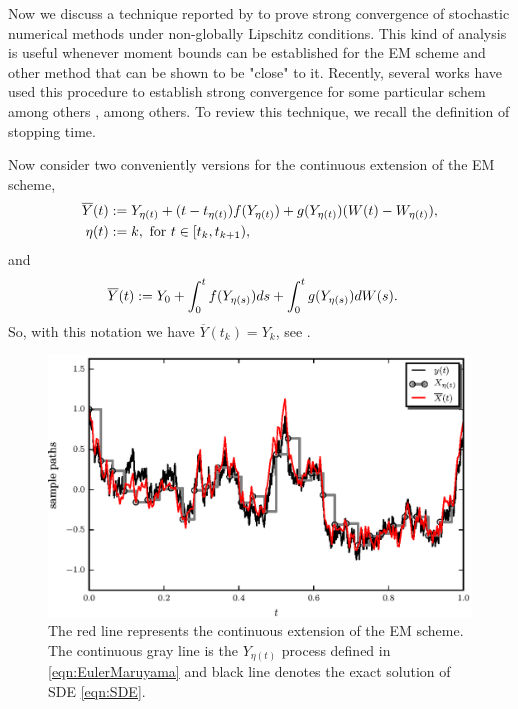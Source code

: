 	Now we discuss a technique  reported  by  \citet*{Higham2002b} to prove strong convergence 
of stochastic numerical methods under non-globally Lipschitz conditions.
This kind of analysis is useful whenever moment bounds can be established for the EM scheme and 
other method that can be shown to be "close" to it. Recently, several works have used this procedure to establish 
strong convergence for some particular schem among others
\cite{Beyn2010, Guo2014, Hutzenthaler2015, Hutzenthaler2012a,Hutzenthaler2010,Lamba2007,Mao2013,Tretyakov2013}, among
others. To review this technique, we recall the definition of stopping time. 

Now consider two conveniently versions for the continuous extension of the EM 
scheme,
\begin{align}\label{eqn:EMContinuousExtension}
	\overline{Y}(t)&:=
		Y_{\eta(t)} + (t-t_{\eta(t)}) f(Y_{\eta(t)}) + g(Y_{\eta(t)})(W(t)-W_{\eta(t)}),\\
		\eta(t)&:=
			 k, \text{ for } t\in[t_k,t_{k+1}), \notag
\end{align}
and
\begin{align}
		\overline{Y}(t)
		&:=
			Y_0 + \int_{0}^t f(Y_{\eta(s)})ds + 
			\int_0^tg(Y_{\eta(s)})dW(s). \notag \label{eqn:EMIntegralContinuousExtension}
\end{align}
So, with this notation we have $\overline{Y}(t_k)=Y_k$, see .
%
\begin{figure}[h!]
	\centering
	\includegraphics{papers/paperB/sections/ContinuousExtPy/ContinuousExtension.eps}
	\caption{
		The red line represents the continuous extension of the EM scheme. The continuous gray line is the 
		$Y_{\eta(t)}$ 
		process defined in \eqref{eqn:EulerMaruyama} and black line denotes the exact solution of 
		SDE \eqref{eqn:SDE}.
	}
	\label{fig:ContinuousExtension}
\end{figure}
